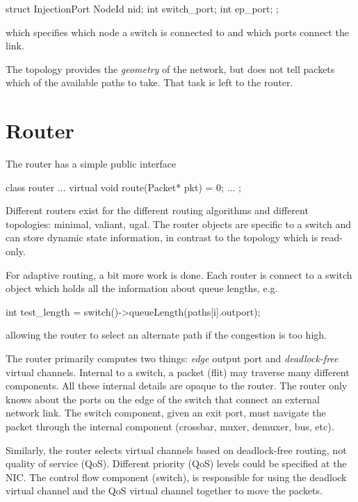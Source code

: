 \begin{CppCode}
struct InjectionPort {
  NodeId nid;
  int switch_port;
  int ep_port;
};
\end{CppCode}
which specifies which node a switch is connected to and which ports connect the link.

The topology provides the \emph{geometry} of the network, but does not tell packets which of the available paths to take. 
That task is left to the router.


\section{Router}\label{sec:router}
The router has a simple public interface

\begin{CppCode}
class router {
...
  virtual void route(Packet* pkt) = 0;
...
};
\end{CppCode}

Different routers exist for the different routing algorithms and different topologies: 	minimal, valiant, ugal.
The router objects are specific to a switch and can store dynamic state information,
in contrast to the topology which is read-only.

For adaptive routing, a bit more work is done.
Each router is connect to a switch object which holds all the information about queue lengths, e.g.

\begin{CppCode}
int test_length = switch()->queueLength(paths[i].outport);
\end{CppCode}
allowing the router to select an alternate path if the congestion is too high. 

The router primarily computes two things: \emph{edge} output port and \emph{deadlock-free} virtual channels.
Internal to a switch, a packet (flit) may traverse many different components.
All these internal details are opaque to the router.
The router only knows about the ports on the edge of the switch that connect an external network link. 
The switch component, given an exit port, must navigate the packet through the internal component (crossbar, muxer, demuxer, bus, etc).

Similarly, the router selects virtual channels based on deadlock-free routing, not quality of service (QoS).
Different priority (QoS) levels could be specified at the NIC.
The control flow component (switch), is responsible for using the deadlock virtual channel and the QoS virtual channel together to move the packets. 




